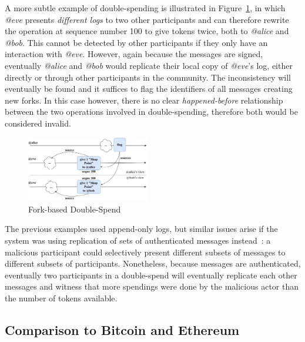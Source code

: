 \documentclass[sigplan,screen,10pt,review,anonymous]{acmart}
\begin{document}
A more subtle example of double-spending is illustrated in Figure~\ref{figure:fork-double-spend}, in which \textit{@eve} presents \textit{different logs} to two other participants and can therefore rewrite the operation at sequence number 100 to give tokens twice, both to \textit{@alice} and \textit{@bob}. This cannot be detected by other participants if they only have an interaction with \textit{@eve}. However, again because the messages are signed, eventually \textit{@alice} and \textit{@bob} would replicate their local copy of \textit{@eve}'s log, either directly or through other participants in the community. The inconsistency will eventually be found and it suffices to flag the identifiers of all messages creating new forks. In this case however, there is no clear \textit{happened-before} relationship between the two operations involved in double-spending, therefore both would be considered invalid.

\begin{figure}[htbp]
\centering
\includegraphics[width=0.48\textwidth]{figures/fork-double-spend-drawio}
\caption{Fork-based Double-Spend}
\label{figure:fork-double-spend}
\end{figure}

The previous examples used append-only logs, but similar issues arise if the system was using replication of sets of authenticated messages instead~\cite{meyer2021setreconciliation}: a malicious participant could selectively present different subsets of messages to different subsets of participants. Nonetheless, because messages are authenticated, eventually two participants in a double-spend will eventually replicate each other messages and witness that more spendings were done by the malicious actor than the number of tokens available.

\subsection{Comparison to Bitcoin and Ethereum}
\end{document}

